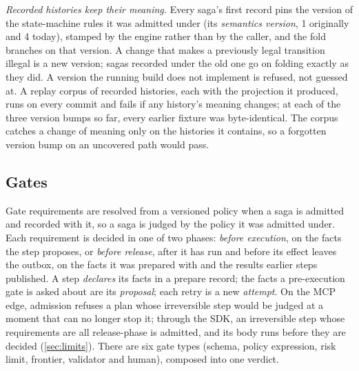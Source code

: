\emph{Recorded histories keep their meaning.} Every saga's first record pins
the version of the state-machine rules it was admitted under (its
\emph{semantics version}, 1 originally and 4 today), stamped by the
engine rather than by the caller, and the fold branches on that version. A
change that makes a previously legal transition illegal is a new version;
sagas recorded under the old one go on folding exactly as they did. A version
the running build does not implement is refused, not guessed at. A replay
corpus of recorded histories, each with the projection it produced, runs on
every commit and fails if any history's meaning changes; at each of the three
version bumps so far, every earlier fixture was byte-identical. The corpus catches
a change of meaning only on the histories it contains, so a forgotten version bump
on an uncovered path would pass.

\subsection{Gates}
\label{sec:design-gates}
Gate requirements are resolved from a versioned policy when a saga is admitted
and recorded with it, so a saga is judged by the policy it was admitted under.
Each requirement is decided in one of two phases: \emph{before execution}, on
the facts the step proposes, or \emph{before release}, after it has run and
before its effect leaves the outbox, on the facts it was prepared with and the
results earlier steps published. A step \emph{declares} its facts in a prepare
record; the facts a pre-execution gate is asked about are its \emph{proposal};
each retry is a new \emph{attempt}. On the MCP edge, admission refuses a plan
whose irreversible step would be judged at a moment that can no longer stop it;
through the SDK, an irreversible step whose requirements are all release-phase
is admitted, and its body runs before they are decided (\cref{sec:limits}).
There are six gate types (schema, policy expression,
risk limit, frontier, validator and human), composed into one verdict.


